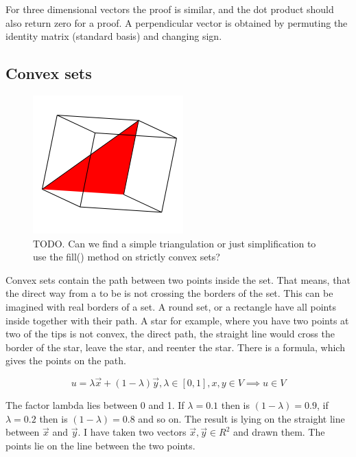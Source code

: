 \documentclass[a4paper]{article}
\begin{document}
\begin{Example}
For three dimensional vectors the proof is similar, and the dot product should also return zero for a proof. A perpendicular vector is obtained by permuting the identity matrix (standard basis) and changing sign.





\subsection{Convex sets}

\begin{flushleft}
\begin{figure}[ht]

\includegraphics[scale=0.5]{filling.png}
\caption{TODO. Can we find a simple triangulation or just simplification to use the fill() method on strictly convex sets?}

\end{figure}
\end{flushleft}


Convex sets contain the path between two points inside the set. That means, that the direct way from a to be is not crossing the borders of the set. This can be imagined with real borders of a set. A round set, or a rectangle have all points inside together with their path. A star for example, where you have two points at two of the tips is not convex, the direct path, the straight line would cross the border of the star, leave the star, and reenter the star. There is a formula, which gives the points on the path.

\begin{displaymath}
u = \lambda\vec{x} + (1-\lambda)\vec{y}, \lambda \in [0,1], x,y \in V \implies u \in V
\end{displaymath}

The factor lambda lies between 0 and 1. If $\lambda = 0.1$ then is $(1-\lambda) = 0.9$, if $\lambda = 0.2$ then is $(1-\lambda) = 0.8$ and so on. The result is lying on the straight line between $\vec{x}$ and $\vec{y}$. I have taken two vectors $\vec{x}, \vec{y} \in R^2$ and drawn them. The points lie on the line between the two points.


\end{Example}
\end{document}
